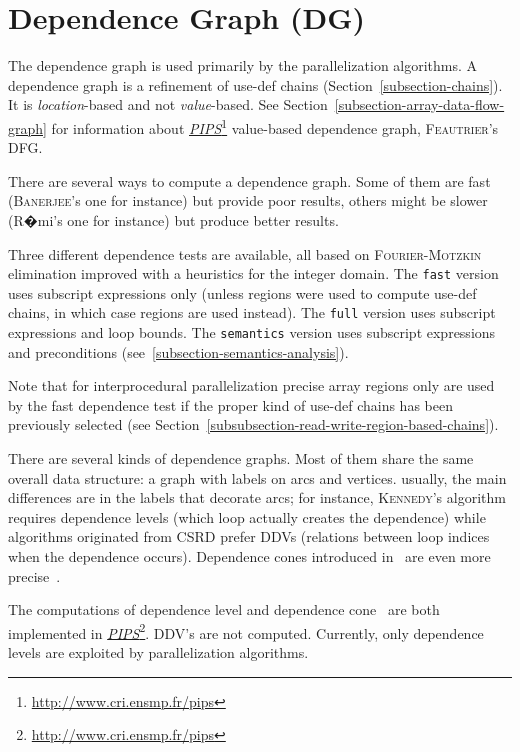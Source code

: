 \documentclass[a4paper]{report}
\newcommand{\LINK}[2]{\href{#2}{#1}\footnote{\url{#2}}\xspace}
\newcommand{\PIPS}{\LINK{\emph{PIPS}}{http://www.cri.ensmp.fr/pips}}
\begin{document}
\section{Dependence Graph (DG)}
\label{subsection-dependence-graph}

The dependence graph is used primarily by the parallelization
algorithms. A dependence graph is a refinement of use-def chains
(Section~\ref{subsection-chains}). It is {\em location}-based and not
{\em value}-based. See Section~\ref{subsection-array-data-flow-graph}
for information about \PIPS{} value-based dependence graph, \textsc{Feautrier}'s
DFG.

There are several ways to compute a dependence graph. Some of them are
fast (\textsc{Banerjee}'s one for instance) but provide poor results, others
might be slower (R�mi's one for instance) but produce better
results.

Three different dependence tests are available, all based on
\textsc{Fourier}-\textsc{Motzkin} elimination improved with a heuristics for the integer
domain. The \verb+fast+ version uses subscript expressions only (unless regions
were used to compute use-def chains, in which case regions are used
instead). The \verb+full+ version uses subscript expressions and loop
bounds. The \verb+semantics+ version uses subscript expressions and
preconditions (see~\ref{subsection-semantics-analysis}).

Note that for interprocedural parallelization precise array regions only
are used by the fast dependence test if the proper kind of use-def
chains has been previously selected (see
Section~\ref{subsubsection-read-write-region-based-chains}).

There are several kinds of dependence graphs. Most of them share the
same overall data structure: a graph with labels on arcs and vertices.
usually, the main differences are in the labels that decorate arcs;
for instance, \textsc{Kennedy}'s algorithm requires dependence levels (which
loop actually creates the dependence) while algorithms originated from
CSRD prefer DDVs (relations between loop indices when the dependence
occurs). Dependence cones introduced in~\cite{I87,IT87a,IT87b,IT88a}
are even more precise~\cite{AIY94}.

The computations of dependence level and dependence cone~\cite{Y93} are
both implemented in \PIPS{}. DDV's are not computed. Currently, only
dependence levels are exploited by parallelization algorithms.
\end{document}
